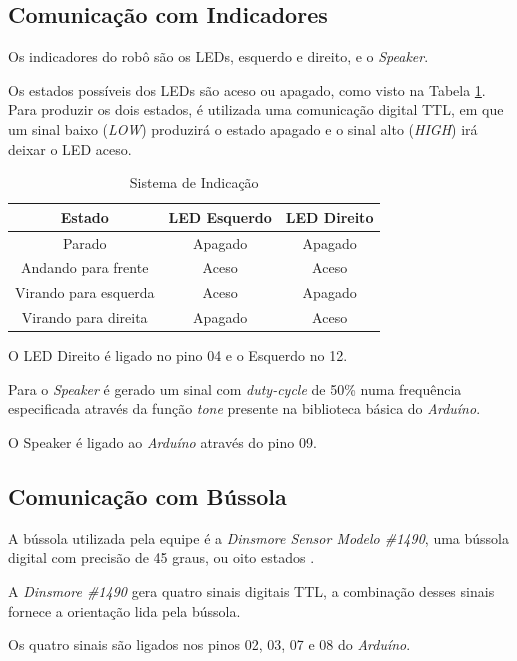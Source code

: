 \subsection{Comunicação com Indicadores}

Os indicadores do robô são os LEDs, esquerdo e direito, e o \textit{Speaker}. 

Os estados possíveis dos LEDs são aceso ou apagado, como visto na Tabela \ref{int_tbl01}. Para produzir os dois estados, é utilizada uma comunicação digital TTL, em que um sinal baixo (\textit{LOW}) produzirá o estado apagado e o sinal alto (\textit{HIGH}) irá deixar o LED aceso.

\begin{table}[h!]
    \centering
    \begin{tabular}{|c|c|c|} \hline
        \textbf{Estado} & \textbf{LED Esquerdo} & \textbf{LED Direito} \\ \hline
        Parado & Apagado & Apagado \\ \hline
        Andando para frente & Aceso & Aceso \\ \hline
        Virando para esquerda & Aceso & Apagado \\ \hline
        Virando para direita & Apagado & Aceso \\ \hline
    \end{tabular}
    \caption{Sistema de Indicação}
    \label{int_tbl01}
\end{table}

O LED Direito é ligado no pino 04 e o Esquerdo no 12.

Para o \textit{Speaker} é gerado um sinal com \textit{duty-cycle} de 50\% numa frequência especificada através da função \textit{tone} presente na biblioteca básica do \textit{Arduíno}.

O Speaker é ligado ao \textit{Arduíno} através do pino 09.

\subsection{Comunicação com Bússola}

A bússola utilizada pela equipe é a \textit{Dinsmore Sensor Modelo \#1490}, uma bússola digital com precisão de 45 graus, ou oito estados \cite{bussola}.

A \textit{Dinsmore \#1490} gera quatro sinais digitais TTL, a combinação desses sinais fornece a orientação lida pela bússola.

Os quatro sinais são ligados nos pinos 02, 03, 07 e 08 do \textit{Arduíno}.

